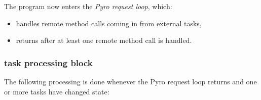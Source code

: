 \documentclass[12pt]{amsart}
\begin{document}
The program now enters the {\em Pyro request loop}, which:

    \begin{itemize}
    \item handles remote method calls coming in from external tasks, 
    \item returns after at least one remote method call is handled. 
    \end{itemize}

\subsubsection{task processing block} 

The following processing is done whenever the Pyro request loop returns
and one or more tasks have changed state: 
\end{document}
